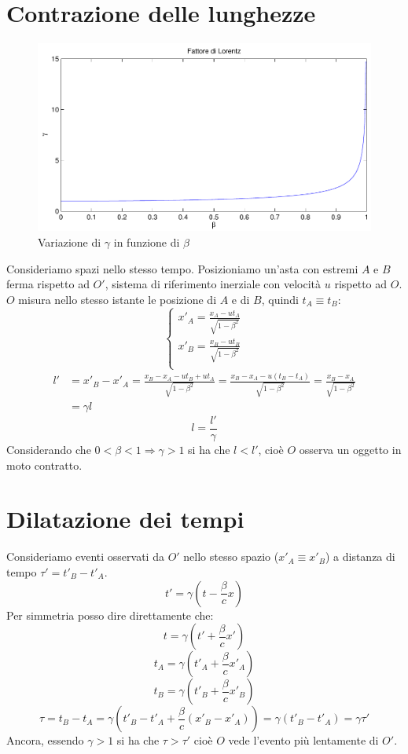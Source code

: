 \section{Contrazione delle lunghezze}
\begin{figure}[htbp]
   \centering
   \includegraphics[scale=0.5]{immagini/fisica1/beta_gamma}
   \caption{Variazione di $\gamma$ in funzione di $\beta$}
\end{figure}
Consideriamo spazi nello stesso tempo. Posizioniamo un'asta con estremi $A$ e $B$ ferma rispetto ad $O'$, sistema di riferimento inerziale con velocità $u$ rispetto ad $O$.
$O$ misura nello stesso istante le posizione di $A$ e di $B$, quindi $t_A\equiv t_B$:
$$\left\{
\begin{array}{l}
x'_A=\frac{x_A-ut_A}{\sqrt{1-\beta^2}}\\
x'_B=\frac{x_B-ut_B}{\sqrt{1-\beta^2}}\\
\end{array}
\right.$$
\begin{align*}
l'&=x'_B-x'_A=\frac{x_B-x_A-ut_B+ut_A}{\sqrt{1-\beta^2}}=\frac{x_B-x_A-u(t_B-t_A)}{\sqrt{1-\beta^2}}=\frac{x_B-x_A}{\sqrt{1-\beta^2}}\\
&=\gamma l
\end{align*}
\begin{equation}
l=\frac{l'}{\gamma}
\end{equation}
Considerando che $0<\beta<1\Rightarrow\gamma>1$ si ha che $l<l'$, cioè $O$ osserva un oggetto in moto contratto.

\section{Dilatazione dei tempi}
Consideriamo eventi osservati da $O'$ nello stesso spazio ($x'_A\equiv x'_B$) a distanza di tempo $\tau'=t'_B-t'_A$.
$$t'=\gamma\left(t-\frac{\beta}{c}x\right)$$
Per simmetria posso dire direttamente che:
$$t=\gamma\left(t'+\frac{\beta}{c}x'\right)$$
$$t_A=\gamma\left(t'_A+\frac{\beta}{c}x'_A\right)$$
$$t_B=\gamma\left(t'_B+\frac{\beta}{c}x'_B\right)$$
\begin{equation}
\tau=t_B-t_A=\gamma\left(t'_B-t'_A+\frac{\beta}{c}\left(x'_B-x'_A\right)\right)=\gamma\left(t'_B-t'_A\right)=\gamma\tau'
\end{equation}
Ancora, essendo $\gamma>1$ si ha che $\tau>\tau'$ cioè $O$ vede l'evento più lentamente di $O'$.

